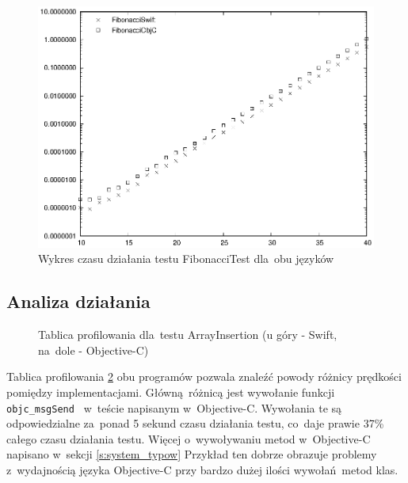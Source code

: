 \documentclass[mgr, shortabstract]{iithesis}
\newcommand{\objcinline}[1]{
    \texttt{#1}
}
\begin{document}
\begin{figure}[ht]
    \includegraphics{plots/Fibonacci.eps}
    \caption{Wykres czasu działania testu FibonacciTest dla~obu języków}
    \label{p:fibonacci}
\end{figure}

\subsection{Analiza działania}

\begin{figure}
    \caption{Tablica profilowania dla~testu ArrayInsertion (u góry - Swift, na~dole - Objective-C)}
    \label{i:fibonacci}
\end{figure}

Tablica profilowania \ref{i:fibonacci} obu programów pozwala znaleźć powody różnicy prędkości pomiędzy implementacjami. Główną różnicą jest wywołanie funkcji \objcinline{objc_msgSend } w~teście napisanym w~Objective-C. Wywołania te są odpowiedzialne za~ponad 5 sekund czasu działania testu, co~daje prawie 37\% całego czasu działania testu. Więcej o~wywoływaniu metod w~Objective-C napisano w~sekcji \ref{s:system_typow} Przykład ten dobrze obrazuje problemy z~wydajnością języka Objective-C przy bardzo dużej ilości wywołań metod klas.
\end{document}
